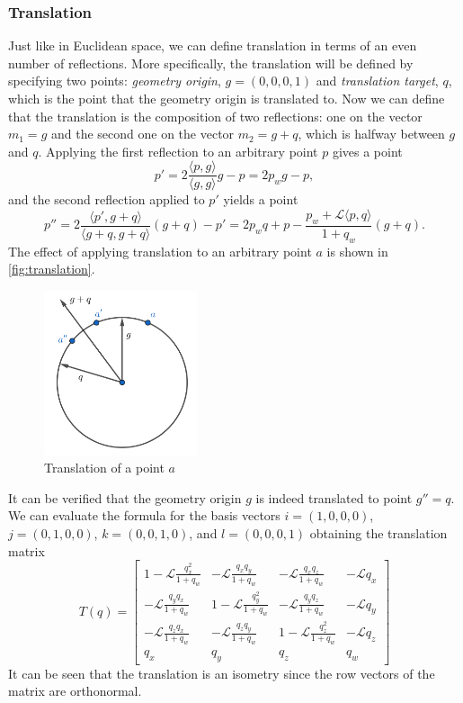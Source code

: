 \subsubsection{Translation}
Just like in Euclidean space, we can define translation in terms of an even number of reflections.
More specifically, the translation will be defined by specifying two points: \textit{geometry origin}, $g = (0, 0, 0, 1)$ and \textit{translation target}, $q$, which is the point that the geometry origin is translated to.
Now we can define that the translation is the composition of two reflections: one on the vector $m_1 = g$ and the second one on the vector $m_2 = g + q$, which is halfway between $g$ and $q$.
Applying the first reflection to an arbitrary point $p$ gives a point
$$p' = 2 \frac{\langle p, g \rangle}{\langle g, g \rangle}g - p = 2p_w g - p,$$
and the second reflection applied to $p'$ yields a point
$$p'' = 2 \frac{\langle p', g + q \rangle}{\langle g + q, g + q \rangle}(g + q) - p'
    = 2 p_w q + p - \frac{p_w + \mathcal{L}\langle p, q \rangle}{1 + q_w}(g + q).$$
The effect of applying translation to an arbitrary point $a$ is shown in \autoref{fig:translation}.\\
\begin{figure}[h]
    \centering
    \includegraphics[width=0.4\textwidth]{chapters/theoretical_foundations/sections/non-eudlidean-spaces/resources/translation.png}
    \caption{Translation of a point $a$}
    \label{fig:translation}
\end{figure}
It can be verified that the geometry origin $g$ is indeed translated to point $g'' = q$.
We can evaluate the formula for the basis vectors $i = (1, 0, 0, 0)$, $j = (0, 1, 0, 0)$, $k = (0, 0, 1, 0)$, and $l = (0, 0, 0, 1)$ obtaining the translation matrix
$$
    T(q) = \begin{bmatrix}
        1 - \mathcal{L}\frac{q_x^2}{1 + q_w} & -\mathcal{L}\frac{q_x q_y}{1 + q_w}  & -\mathcal{L}\frac{q_x q_z}{1 + q_w}  & -\mathcal{L} q_x \\
        -\mathcal{L}\frac{q_y q_x}{1 + q_w}  & 1 - \mathcal{L}\frac{q_y^2}{1 + q_w} & -\mathcal{L}\frac{q_y q_z}{1 + q_w}  & -\mathcal{L} q_y \\
        -\mathcal{L}\frac{q_z q_x}{1 + q_w}  & -\mathcal{L}\frac{q_z q_y}{1 + q_w}  & 1 - \mathcal{L}\frac{q_z^2}{1 + q_w} & -\mathcal{L} q_z \\
        q_x                                  & q_y                                  & q_z                                  & q_w
    \end{bmatrix}
$$
It can be seen that the translation is an isometry since the row vectors of the matrix are orthonormal.

